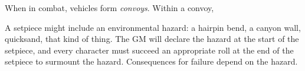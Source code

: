 
When in combat, vehicles form \emph{convoys}. Within a convoy,

A setpiece might include an environmental hazard: a hairpin bend, a canyon wall, quicksand, that kind of thing. The GM will declare the hazard at the start of the setpiece, and every character must succeed an appropriate roll at the end of the setpiece to surmount the hazard. Consequences for failure depend on the hazard.
